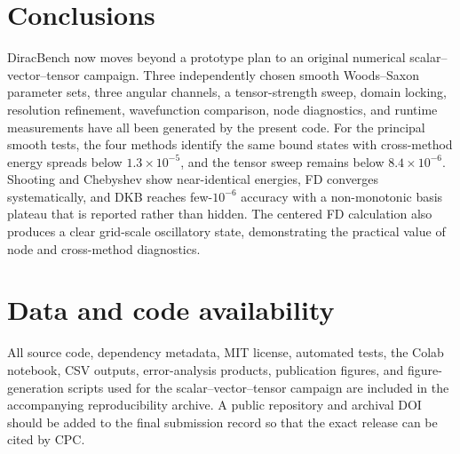 \documentclass[a4paper,fleqn]{cas-dc}
\begin{document}
\section{Conclusions}
DiracBench now moves beyond a prototype plan to an original numerical scalar--vector--tensor campaign. Three independently chosen smooth Woods--Saxon parameter sets, three angular channels, a tensor-strength sweep, domain locking, resolution refinement, wavefunction comparison, node diagnostics, and runtime measurements have all been generated by the present code. For the principal smooth tests, the four methods identify the same bound states with cross-method energy spreads below $1.3\times10^{-5}$, and the tensor sweep remains below $8.4\times10^{-6}$. Shooting and Chebyshev show near-identical energies, FD converges systematically, and DKB reaches few-$10^{-6}$ accuracy with a non-monotonic basis plateau that is reported rather than hidden. The centered FD calculation also produces a clear grid-scale oscillatory state, demonstrating the practical value of node and cross-method diagnostics.

\section*{Data and code availability}
All source code, dependency metadata, MIT license, automated tests, the Colab notebook, CSV outputs, error-analysis products, publication figures, and figure-generation scripts used for the scalar--vector--tensor campaign are included in the accompanying reproducibility archive. A public repository and archival DOI should be added to the final submission record so that the exact release can be cited by CPC.
\end{document}
